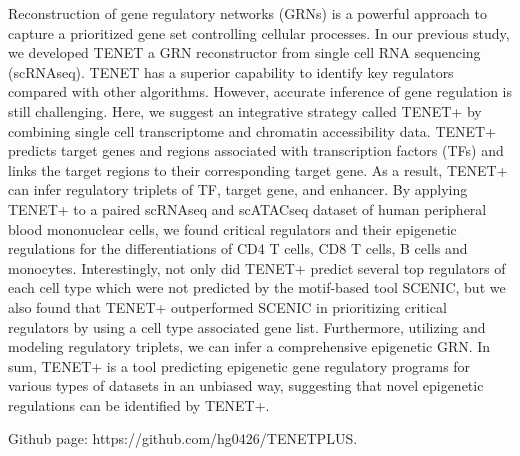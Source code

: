 \noindent
Reconstruction of gene regulatory networks (GRNs) is a powerful approach to capture a prioritized gene set controlling cellular processes. In our previous study, we developed TENET a GRN reconstructor from single cell RNA sequencing (scRNAseq). TENET has a superior capability to identify key regulators compared with other algorithms. However, accurate inference of gene regulation is still challenging. Here, we suggest an integrative strategy called TENET+ by combining single cell transcriptome and chromatin accessibility data. TENET+ predicts target genes and regions associated with transcription factors (TFs) and links the target regions to their corresponding target gene. As a result, TENET+ can infer regulatory triplets of TF, target gene, and enhancer. By applying TENET+ to a paired scRNAseq and scATACseq dataset of human peripheral blood mononuclear cells, we found critical regulators and their epigenetic regulations for the differentiations of CD4 T cells, CD8 T cells, B cells and monocytes. Interestingly, not only did TENET+ predict several top regulators of each cell type which were not predicted by the motif-based tool SCENIC, but we also found that TENET+ outperformed SCENIC in prioritizing critical regulators by using a cell type associated gene list. Furthermore, utilizing and modeling regulatory triplets, we can infer a comprehensive epigenetic GRN. In sum, TENET+ is a tool predicting epigenetic gene regulatory programs for various types of datasets in an unbiased way, suggesting that novel epigenetic regulations can be identified by TENET+.

\noindent
Github page: https://github.com/hg0426/TENETPLUS.
\newpage